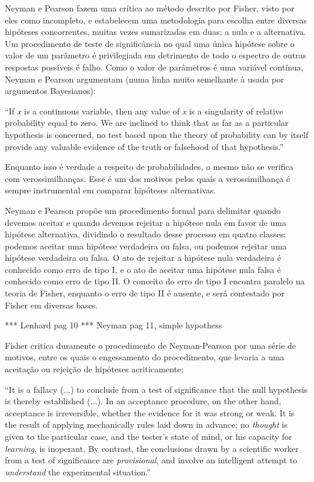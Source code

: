 \documentclass[12pt,a4paper]{article}
\begin{document}
Neyman e Pearson fazem uma crítica ao método descrito por Fisher, visto por eles como incompleto, e estabelecem uma metodologia
para escolha entre diversas hipóteses concorrentes, muitas vezes sumarizadas em duas: a nula e a alternativa.
Um procedimento de teste de significância
no qual uma única hipótese sobre o valor de um parâmetro é privilegiada em detrimento de todo o espectro de outras respostas
possíveis é falho. Como o valor de parâmetros é uma variável contínua, Neyman e Pearson argumentam (numa linha muito semelhante
à usada por argumentos Bayesianos):

``If {\em x} is a continuous variable, then any value of {\em x} is a singularity of relative probability equal to zero. We are
inclined to think that as far as a particular hypothesis is concerned, no test based upon the theory of probability can by
itself provide any valuable evidence of the truth or falsehood of that hypothesis.''\cite{Neyman1933}

Enquanto isso é verdade a respeito de probabilidades, o mesmo não se verifica com verossimilhanças. Esse é um dos motivos
pelos quais a verossimilhança é sempre instrumental em comparar hipóteses alternativas.

Neyman e Pearson propõe um procedimento formal para delimitar quando devemos aceitar e quando devemos rejeitar a hipótese
nula em favor de uma hipótese alternativa, dividindo o resultado desse processo em quatro classes: podemos aceitar uma hipótese
verdadeira ou falsa, ou podemos rejeitar uma hipótese verdadeira ou falsa. O ato de rejeitar a hipótese nula verdadeira
é conhecido como erro de tipo I, e o ato de aceitar uma hipótese nula falsa é conhecido como erro de tipo II. O conceito do 
erro de tipo I encontra paralelo na teoria de Fisher, enquanto o erro de tipo II é ausente, e será contestado por Fisher em
diversas bases.

*** Lenhard pag 10
*** Neyman pag 11, simple hypothess

Fisher critica duramente o procedimento de Neyman-Pearson por uma série de motivos, entre os quais o engessamento do procedimento,
que levaria a uma aceitação ou rejeição de hipóteses acriticamente:

``It is a fallacy (...) to conclude from a test of significance that the null hypothesis is thereby established (...).
In an acceptance procedure, on the other hand, acceptance is irreversible, whether the evidence for it was strong or weak.
It is the result of applying mechanically rules laid down in advance; no {\em thought} is given to the particular case,
and the tester's state of mind, or his capacity for {\em learning}, is inoperant.
By contrast, the conclusions drawn by a scientific worker from a test of significance are {\em provisional}, and involve
an intelligent attempt to {\em understand} the experimental situation.''\cite{Fisher1955}
\end{document}
